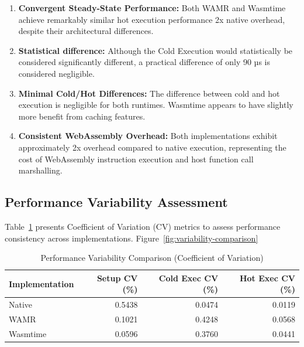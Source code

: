 \begin{enumerate}
    \item \textbf{Convergent Steady-State Performance:} Both WAMR and Wasmtime achieve remarkably similar hot execution performance 2x native overhead, despite their architectural differences.

    \item \textbf{Statistical difference:} Although the Cold Execution would statistically be considered significantly different, a practical difference of only 90 µs is considered negligible.
    
    \item \textbf{Minimal Cold/Hot Differences:} The difference between cold and hot execution is negligible for both runtimes. Wasmtime appears to have slightly more benefit from caching features.
    
    \item \textbf{Consistent WebAssembly Overhead:} Both implementations exhibit approximately 2x overhead compared to native execution, representing the cost of WebAssembly instruction execution and host function call marshalling.
\end{enumerate}

\subsection{Performance Variability Assessment}
\label{subsec:eval-execution-variability}

Table~\ref{tab:variability} presents Coefficient of Variation (CV) metrics to assess performance consistency across implementations. Figure~\ref{fig:variability-comparison}

\begin{table}[htbp]
    \centering
    \caption{Performance Variability Comparison (Coefficient of Variation)}
    \label{tab:variability}
    \begin{tabular}{lrrr}
    \toprule
    \textbf{Implementation} & \textbf{Setup CV (\%)} & \textbf{Cold Exec CV (\%)} & \textbf{Hot Exec CV (\%)} \\
    \midrule
    Native       & 0.5438 & 0.0474 & 0.0119 \\
    WAMR         & 0.1021 & 0.4248 & 0.0568 \\
    Wasmtime     & 0.0596 & 0.3760 & 0.0441 \\
    \bottomrule
    \end{tabular}
\end{table}

